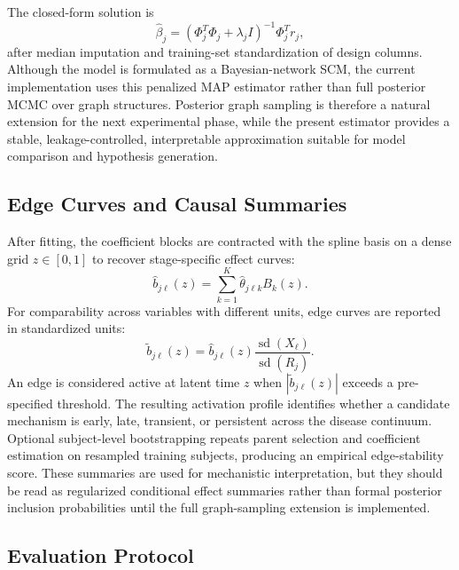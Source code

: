The closed-form solution is
\begin{equation}
\widehat{\beta}_j
=
(\Phi_j^T\Phi_j+\lambda_j I)^{-1}\Phi_j^T r_j,
\label{eq:bnlte_solution}
\end{equation}
after median imputation and training-set standardization of design columns.
Although the model is formulated as a Bayesian-network SCM, the current
implementation uses this penalized MAP estimator rather than full posterior
MCMC over graph structures. Posterior graph sampling is therefore a natural
extension for the next experimental phase, while the present estimator provides
a stable, leakage-controlled, interpretable approximation suitable for model
comparison and hypothesis generation.

\subsection{Edge Curves and Causal Summaries}

After fitting, the coefficient blocks are contracted with the spline basis on a
dense grid $z\in[0,1]$ to recover stage-specific effect curves:
\begin{equation}
\widehat{b}_{j\ell}(z)
=
\sum_{k=1}^{K}
\widehat{\theta}_{j\ell k}B_k(z).
\end{equation}
For comparability across variables with different units, edge curves are
reported in standardized units:
\begin{equation}
\widetilde{b}_{j\ell}(z)
=
\widehat{b}_{j\ell}(z)
\frac{\operatorname{sd}(X_\ell)}
     {\operatorname{sd}(R_j)}.
\label{eq:bnlte_standardized_edge}
\end{equation}
An edge is considered active at latent time $z$ when
$|\widetilde{b}_{j\ell}(z)|$ exceeds a pre-specified threshold. The resulting
activation profile identifies whether a candidate mechanism is early, late,
transient, or persistent across the disease continuum. Optional subject-level
bootstrapping repeats parent selection and coefficient estimation on resampled
training subjects, producing an empirical edge-stability score. These summaries
are used for mechanistic interpretation, but they should be read as
regularized conditional effect summaries rather than formal posterior inclusion
probabilities until the full graph-sampling extension is implemented.

\subsection{Evaluation Protocol}

